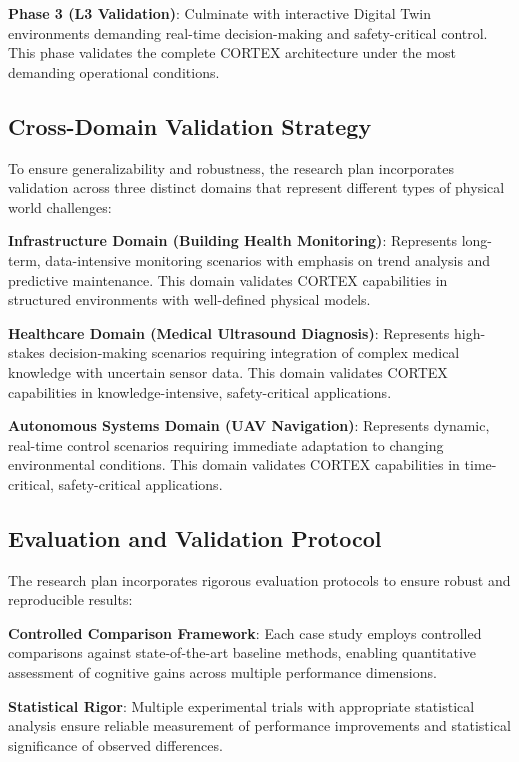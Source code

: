 \textbf{Phase 3 (L3 Validation)}: Culminate with interactive Digital Twin environments demanding real-time decision-making and safety-critical control. This phase validates the complete CORTEX architecture under the most demanding operational conditions.

\subsection{Cross-Domain Validation Strategy}

To ensure generalizability and robustness, the research plan incorporates validation across three distinct domains that represent different types of physical world challenges:

\textbf{Infrastructure Domain (Building Health Monitoring)}: Represents long-term, data-intensive monitoring scenarios with emphasis on trend analysis and predictive maintenance. This domain validates CORTEX capabilities in structured environments with well-defined physical models.

\textbf{Healthcare Domain (Medical Ultrasound Diagnosis)}: Represents high-stakes decision-making scenarios requiring integration of complex medical knowledge with uncertain sensor data. This domain validates CORTEX capabilities in knowledge-intensive, safety-critical applications.

\textbf{Autonomous Systems Domain (UAV Navigation)}: Represents dynamic, real-time control scenarios requiring immediate adaptation to changing environmental conditions. This domain validates CORTEX capabilities in time-critical, safety-critical applications.

\subsection{Evaluation and Validation Protocol}

The research plan incorporates rigorous evaluation protocols to ensure robust and reproducible results:

\textbf{Controlled Comparison Framework}: Each case study employs controlled comparisons against state-of-the-art baseline methods, enabling quantitative assessment of cognitive gains across multiple performance dimensions.

\textbf{Statistical Rigor}: Multiple experimental trials with appropriate statistical analysis ensure reliable measurement of performance improvements and statistical significance of observed differences.

